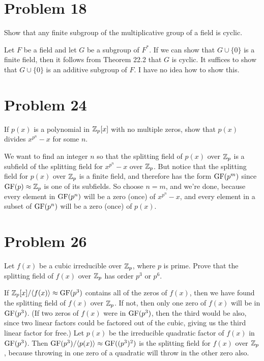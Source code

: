 \documentclass{article}
\begin{document}
\section*{Problem 18}

Show that any finite subgroup of the multiplicative group of a field is cyclic.

Let $F$ be a field and let $G$ be a subgroup of $F^{*}$.
If we can show that $G\cup\{0\}$ is a finite field, then it follows
from Theorem 22.2 that $G$ is cyclic.  It suffices to show that $G\cup\{0\}$
is an additive subgroup of $F$.  I have no idea how to show this.

\section*{Problem 24}

If $p(x)$ is a polynomial in $\mathbb{Z}_p[x]$ with no multiple zeros, show that $p(x)$
divides $x^{p^n}-x$ for some $n$.

We want to find an integer $n$ so that the splitting field of $p(x)$ over
$\mathbb{Z}_p$ is a subfield of the splitting field for $x^{p^n}-x$ over $\mathbb{Z}_p$.
But notice that the splitting field for $p(x)$ over $\mathbb{Z}_p$ is a finite
field, and therefore has the form $\mbox{GF}(p^m)$ since $\mbox{GF}(p)\approx\mathbb{Z}_p$ is
one of its subfields.  So choose $n=m$, and we're done, because every
element in $\mbox{GF}(p^n)$ will be a zero (once) of $x^{p^n}-x$, and every element
in a subset of $\mbox{GF}(p^n)$ will be a zero (once) of $p(x)$.

\section*{Problem 26}

Let $f(x)$ be a cubic irreducible over $\mathbb{Z}_p$, where $p$ is prime.  Prove that
the splitting field of $f(x)$ over $\mathbb{Z}_p$ has order $p^3$ or $p^6$.

If $\mathbb{Z}_p[x]/\langle f(x)\rangle\approx\mbox{GF}(p^3)$ contains all of the zeros
of $f(x)$, then we have found the splitting field of $f(x)$ over $\mathbb{Z}_p$.
If not, then only one zero of $f(x)$ will be in $\mbox{GF}(p^3)$.  (If two
zeros of $f(x)$ were in $\mbox{GF}(p^3)$, then the third would be also, since
two linear factors could be factored out of the cubic, giving us the third linear factor
for free.)  Let $p(x)$ be the irreducible quadratic factor of $f(x)$ in $\mbox{GF}(p^3)$.
Then $\mbox{GF}(p^3)/\langle p(x)\rangle\approx\mbox{GF}((p^3)^2)$ is the splitting field
for $f(x)$ over $\mathbb{Z}_p$, because throwing in one zero of a quadratic will throw
in the other zero also.
\end{document}
